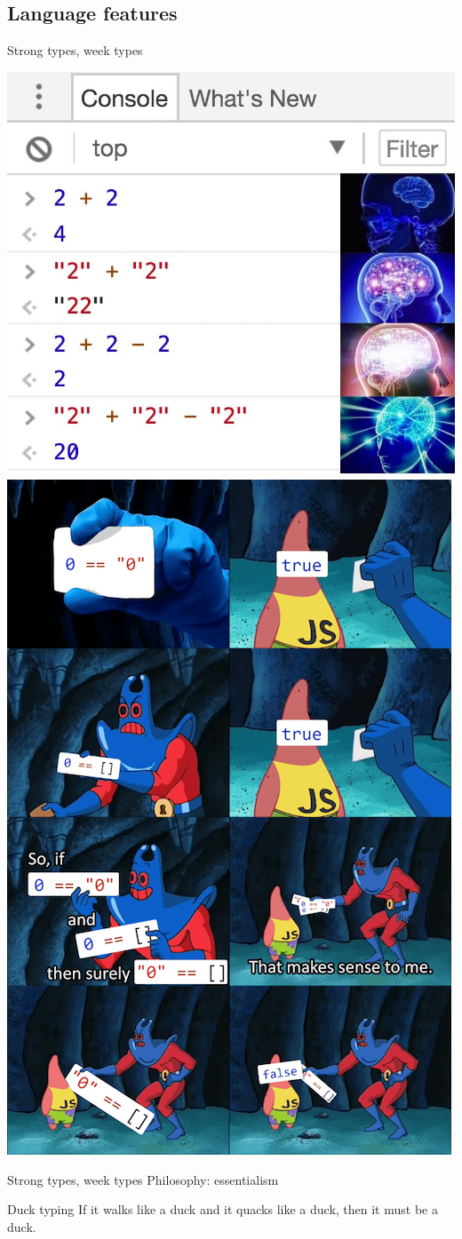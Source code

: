 \documentclass{beamer}
\begin{document}
\begin{CJK*}{UTF8}{bsmi}
    \subsection{Language features}
    \begin{frame}{Strong types, week types}
        \begin{multicols*}{2}
            \includegraphics[width=.5\textwidth]{js_meme1.jpg}
            \includegraphics[width=.5\textwidth]{js_meme2.png}
        \end{multicols*}
    \end{frame}

    \begin{frame}{Strong types, week types}
        Philosophy: essentialism

        \begin{beamerboxesrounded}[]{Duck typing}
            If it walks like a duck and it quacks like a duck, then it must be a duck.
        \end{beamerboxesrounded}
    \end{frame}


\end{CJK*}
\end{document}
